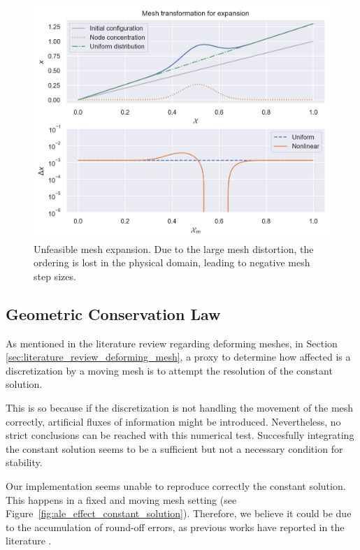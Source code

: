 \documentclass[../../thesis.tex]{subfiles}
\begin{document}
\newpage
\begin{figure}[h]
    \includegraphics[width =\columnwidth]{research_project/piston/figures/nonlinear_displacement/separable/mapping_mu_05_sigma_01_p_175_expansion.png}
    \caption{Unfeasible mesh expansion.
    Due to the large mesh distortion, the ordering is lost in the physical domain,
    leading to negative mesh step sizes.}
    \label{fig:mesh_disp_expansion_unfeasible}
\end{figure}

\newpage
\subsection{Geometric Conservation Law}
As mentioned in the literature review regarding deforming meshes, 
in Section \ref{sec:literature_review_deforming_mesh},
a proxy to determine how affected is a discretization by a moving mesh
is to attempt the resolution of the constant solution.

This is so because if the discretization is not handling the movement of the mesh correctly,
artificial fluxes of information might be introduced. 
Nevertheless, no strict conclusions can be reached with this numerical test.
Succesfully integrating the constant solution seems 
to be a sufficient but not a necessary condition for stability.

Our implementation seems unable to reproduce correctly the constant solution.
This happens in a fixed and moving mesh setting (see Figure~\ref{fig:ale_effect_constant_solution}).
Therefore, we believe it could be due to the accumulation of round-off errors, 
as previous works have reported in the literature \cite{liu2019balancing}.
\end{document}
